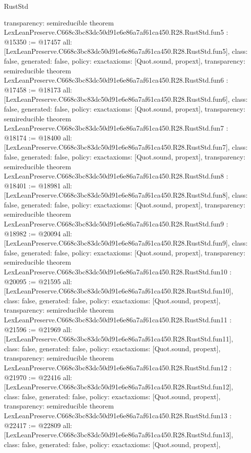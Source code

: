 \begin{lexlean}{RustStd}
\begin{coremodule}
{  transparency: semireducible
}
theorem LexLeanPreserve.C668c3bc83dc50d91e6e86a7af61ca450.R28.RustStd.fun5 : @15350 := @17457 {
  all: [LexLeanPreserve.C668c3bc83dc50d91e6e86a7af61ca450.R28.RustStd.fun5],
  class: false,
  generated: false,
  policy: exact{axioms: [Quot.sound, propext]},
  transparency: semireducible
}
theorem LexLeanPreserve.C668c3bc83dc50d91e6e86a7af61ca450.R28.RustStd.fun6 : @17458 := @18173 {
  all: [LexLeanPreserve.C668c3bc83dc50d91e6e86a7af61ca450.R28.RustStd.fun6],
  class: false,
  generated: false,
  policy: exact{axioms: [Quot.sound, propext]},
  transparency: semireducible
}
theorem LexLeanPreserve.C668c3bc83dc50d91e6e86a7af61ca450.R28.RustStd.fun7 : @18174 := @18400 {
  all: [LexLeanPreserve.C668c3bc83dc50d91e6e86a7af61ca450.R28.RustStd.fun7],
  class: false,
  generated: false,
  policy: exact{axioms: [Quot.sound, propext]},
  transparency: semireducible
}
theorem LexLeanPreserve.C668c3bc83dc50d91e6e86a7af61ca450.R28.RustStd.fun8 : @18401 := @18981 {
  all: [LexLeanPreserve.C668c3bc83dc50d91e6e86a7af61ca450.R28.RustStd.fun8],
  class: false,
  generated: false,
  policy: exact{axioms: [Quot.sound, propext]},
  transparency: semireducible
}
theorem LexLeanPreserve.C668c3bc83dc50d91e6e86a7af61ca450.R28.RustStd.fun9 : @18982 := @20094 {
  all: [LexLeanPreserve.C668c3bc83dc50d91e6e86a7af61ca450.R28.RustStd.fun9],
  class: false,
  generated: false,
  policy: exact{axioms: [Quot.sound, propext]},
  transparency: semireducible
}
theorem LexLeanPreserve.C668c3bc83dc50d91e6e86a7af61ca450.R28.RustStd.fun10 : @20095 := @21595 {
  all: [LexLeanPreserve.C668c3bc83dc50d91e6e86a7af61ca450.R28.RustStd.fun10],
  class: false,
  generated: false,
  policy: exact{axioms: [Quot.sound, propext]},
  transparency: semireducible
}
theorem LexLeanPreserve.C668c3bc83dc50d91e6e86a7af61ca450.R28.RustStd.fun11 : @21596 := @21969 {
  all: [LexLeanPreserve.C668c3bc83dc50d91e6e86a7af61ca450.R28.RustStd.fun11],
  class: false,
  generated: false,
  policy: exact{axioms: [Quot.sound, propext]},
  transparency: semireducible
}
theorem LexLeanPreserve.C668c3bc83dc50d91e6e86a7af61ca450.R28.RustStd.fun12 : @21970 := @22416 {
  all: [LexLeanPreserve.C668c3bc83dc50d91e6e86a7af61ca450.R28.RustStd.fun12],
  class: false,
  generated: false,
  policy: exact{axioms: [Quot.sound, propext]},
  transparency: semireducible
}
theorem LexLeanPreserve.C668c3bc83dc50d91e6e86a7af61ca450.R28.RustStd.fun13 : @22417 := @22809 {
  all: [LexLeanPreserve.C668c3bc83dc50d91e6e86a7af61ca450.R28.RustStd.fun13],
  class: false,
  generated: false,
  policy: exact{axioms: [Quot.sound, propext]},
}
\end{coremodule}
\end{lexlean}
